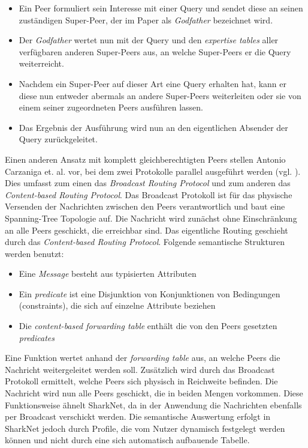 \begin{itemize}
	\item Ein Peer formuliert sein Interesse mit einer Query und sendet diese an seinen zuständigen Super-Peer, der im Paper als \textit{Godfather} bezeichnet wird.
	\item Der \textit{Godfather} wertet nun mit der Query und den \textit{expertise tables} aller verfügbaren anderen Super-Peers aus, an welche Super-Peers er die Query weiterreicht.
	\item Nachdem ein Super-Peer auf dieser Art eine Query erhalten hat, kann er diese nun entweder abermals an andere Super-Peers weiterleiten oder sie von einem seiner zugeordneten Peers ausführen lassen.
	\item Das Ergebnis der Ausführung wird nun an den eigentlichen Absender der Query zurückgeleitet.\\
\end{itemize}
Einen anderen Ansatz mit komplett gleichberechtigten Peers stellen Antonio Carzaniga et. al. vor, bei dem zwei Protokolle parallel ausgeführt werden (vgl. \citet[S. 918ff]{Carzaniga2004}). Dies umfasst zum einen das \textit{Broadcast Routing Protocol} und zum anderen das \textit{Content-based Routing Protocol}. Das Broadcast Protokoll ist für das physische Versenden der Nachrichten zwischen den Peers verantwortlich und baut eine Spanning-Tree Topologie auf. Die Nachricht wird zunächst ohne Einschränkung an alle Peers geschickt, die erreichbar sind. Das eigentliche Routing geschieht durch das \textit{Content-based Routing Protocol}. Folgende semantische Strukturen werden benutzt:
\begin{itemize}
	\item Eine \textit{Message} besteht aus typisierten Attributen
	\item Ein \textit{predicate} ist eine Disjunktion von Konjunktionen von Bedingungen (constraints), die sich auf einzelne Attribute beziehen
	\item Die \textit{content-based forwarding table} enthält die von den Peers gesetzten \textit{predicates} 	
\end{itemize}
Eine Funktion wertet anhand der \textit{forwarding table} aus, an welche Peers die Nachricht weitergeleitet werden soll. Zusätzlich wird durch das Broadcast Protokoll ermittelt, welche Peers sich physisch in Reichweite befinden. Die Nachricht wird nun alle Peers geschickt, die in beiden Mengen vorkommen. Diese Funktionsweise ähnelt SharkNet, da in der Anwendung die Nachrichten ebenfalls per Broadcast verschickt werden. Die semantische Auswertung erfolgt in SharkNet jedoch durch Profile, die vom Nutzer dynamisch festgelegt werden können und nicht durch eine sich automatisch aufbauende Tabelle.\\\\

